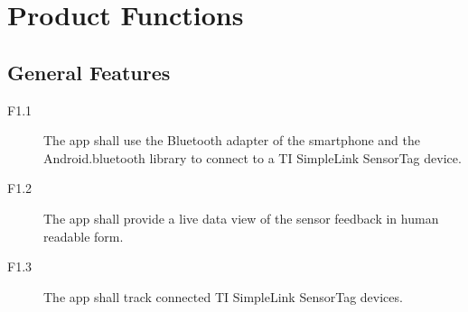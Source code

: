 \section{Product Functions}


\subsection{General Features}
\begin{description}
  \item[F1.1] The app shall use the Bluetooth adapter of the smartphone and the Android.bluetooth library to connect to a TI SimpleLink SensorTag device.
  \item[F1.2] The app shall provide a live data view of the sensor feedback in human readable form.
  \item[F1.3] The app shall track connected TI SimpleLink SensorTag devices.
\end{description}


